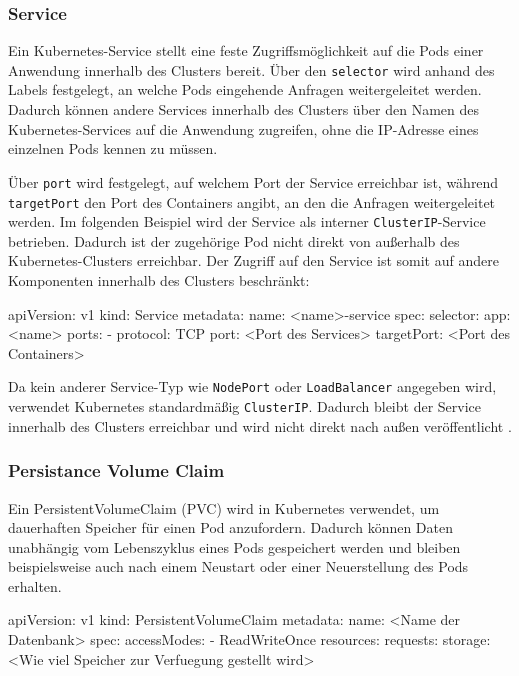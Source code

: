 \subsubsection{Service}

Ein Kubernetes-Service stellt eine feste Zugriffsmöglichkeit auf die Pods einer Anwendung innerhalb des Clusters bereit. Über den \texttt{selector} wird anhand des Labels festgelegt, an welche Pods eingehende Anfragen weitergeleitet werden. Dadurch können andere Services innerhalb des Clusters über den Namen des Kubernetes-Services auf die Anwendung zugreifen, ohne die IP-Adresse eines einzelnen Pods kennen zu müssen.

Über \texttt{port} wird festgelegt, auf welchem Port der Service erreichbar ist, während \texttt{targetPort} den Port des Containers angibt, an den die Anfragen weitergeleitet werden. Im folgenden Beispiel wird der Service als interner \texttt{ClusterIP}-Service betrieben. Dadurch ist der zugehörige Pod nicht direkt von außerhalb des Kubernetes-Clusters erreichbar. Der Zugriff auf den Service ist somit auf andere Komponenten innerhalb des Clusters beschränkt:

\begin{CodeBox}
apiVersion: v1
kind: Service
metadata:
  name: <name>-service
spec:
  selector:
    app: <name>
  ports:
   - protocol: TCP
     port: <Port des Services>
     targetPort: <Port des Containers>
\end{CodeBox}

Da kein anderer Service-Typ wie \texttt{NodePort} oder \texttt{LoadBalancer} angegeben wird, verwendet Kubernetes standardmäßig \texttt{ClusterIP}. Dadurch bleibt der Service innerhalb des Clusters erreichbar und wird nicht direkt nach außen veröffentlicht \cite{kubernetes_service}.

\newpage

\subsubsection{Persistance Volume Claim}

Ein PersistentVolumeClaim (PVC) wird in Kubernetes verwendet, um dauerhaften Speicher für einen Pod anzufordern. Dadurch können Daten unabhängig vom Lebenszyklus eines Pods gespeichert werden und bleiben beispielsweise auch nach einem Neustart oder einer Neuerstellung des Pods erhalten.

\begin{CodeBox}
apiVersion: v1
kind: PersistentVolumeClaim
metadata:
  name: <Name der Datenbank>
spec:
  accessModes:
    - ReadWriteOnce
  resources:
    requests:
      storage: <Wie viel Speicher zur Verfuegung gestellt wird>
\end{CodeBox}

